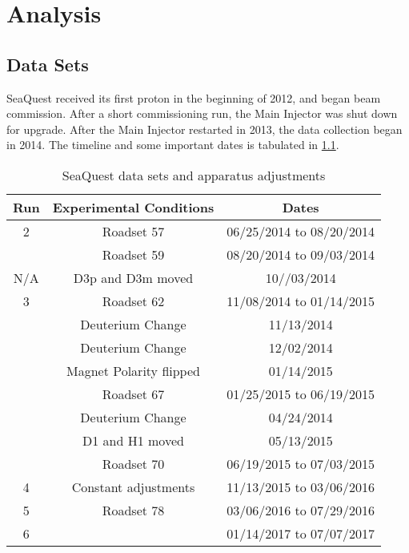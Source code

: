 \documentclass[../main.tex]{subfiles}
\begin{document}
\ifSubfilesClassLoaded{
	\mainmatter
	\setcounter{chapter}{4}
}{}

\chapter{Analysis}
\label{ch:analysis}

\section{Data Sets}
SeaQuest received its first proton in the beginning of 2012, and began beam
commission. After a short commissioning run, the Main Injector was shut down for
upgrade. After the Main Injector restarted in 2013, the data collection began in
2014. The timeline and some important dates is tabulated in \cref{tab:dataset}.
\begin{table}[h!]
	\centering
	\begin{tabular}{ c c c }
		\hline
		Run & Experimental Conditions & Dates                    \\
		\hline
		2   & Roadset 57              & 06/25/2014 to 08/20/2014 \\
		    & Roadset 59              & 08/20/2014 to 09/03/2014 \\
		\hline
		N/A & D3p and D3m moved       & 10//03/2014              \\
		\hline
		3   & Roadset 62              & 11/08/2014 to 01/14/2015 \\
		    & Deuterium Change        & 11/13/2014               \\
		    & Deuterium Change        & 12/02/2014               \\
		    & Magnet Polarity flipped & 01/14/2015               \\
		    & Roadset 67              & 01/25/2015 to 06/19/2015 \\
		    & Deuterium Change        & 04/24/2014               \\
		    & D1 and H1 moved         & 05/13/2015               \\
		    & Roadset 70              & 06/19/2015 to 07/03/2015 \\
		\hline
		4   & Constant adjustments    & 11/13/2015 to 03/06/2016 \\
		5   & Roadset 78              & 03/06/2016 to 07/29/2016 \\
		6   &                         & 01/14/2017 to 07/07/2017 \\
	\end{tabular}
	\caption{SeaQuest data sets and apparatus adjustments}
	\label{tab:dataset}
\end{table}
\end{document}
